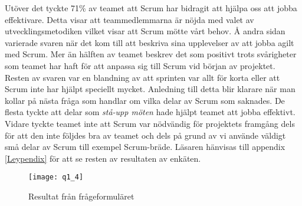 Utöver det tyckte 71\% av teamet att Scrum har bidragit att hjälpa oss att jobba effektivare. Detta visar att teammedlemmarna är nöjda med valet av utvecklingsmetodiken vilket visar att Scrum mötte vårt behov. Å andra sidan varierade svaren när det kom till att beskriva sina upplevelser av att jobba agilt med Scrum. Mer än hälften av teamet beskrev det som positivt trots svårigheter som teamet har haft för att anpassa sig till Scrum vid början av projektet. Resten av svaren var en blandning av att sprinten var allt för korta eller att Scrum inte har hjälpt speciellt mycket. Anledning till detta blir klarare när man kollar på nästa fråga som handlar om vilka delar av Scrum som saknades. De flesta tyckte att delar som \textit{stå-upp möten} hade  hjälpt teamet att jobba effektivt. Vidare tyckte teamet inte att Scrum var nödvändig för projektets framgång dels för att den inte följdes bra av teamet och dels på grund av vi använde väldigt små delar av Scrum till exempel Scrum-bräde.
Läsaren hänvisas till appendix \ref{Leypendix} för att se resten av resultaten av enkäten.
\begin{figure*}[h]
	\centering
	\texttt{[image: q1\_4]}
	\caption{Resultat från frågeformuläret}\label{fig1}
	\label{q1}
\end{figure*}

